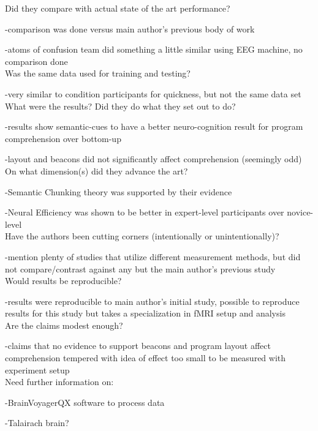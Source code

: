 \documentclass{IEEEtran}
\begin{document}
Did they compare with actual state of the art performance?

-comparison was done versus main author's previous body of work

-atoms of confusion team did something a little similar using EEG machine, no comparison done
\\

Was the same data used for training and testing?

-very similar to condition participants for quickness, but not the same data set
\\

What were the results? Did they do what they set out to do?

-results show semantic-cues to have a better neuro-cognition result for program comprehension over bottom-up 

-layout and beacons did not significantly affect comprehension (seemingly odd)
\\

On what dimension(s) did they advance the art?

-Semantic Chunking theory was supported by their evidence

-Neural Efficiency was shown to be better in expert-level participants over novice-level 
\\

Have the authors been cutting corners (intentionally or unintentionally)?

-mention plenty of studies that utilize different measurement methods, but did not compare/contrast against any but 
the main author's previous study
\\

Would results be reproducible? 

-results were reproducible to main author's initial study, possible to reproduce results for this study but takes a 
specialization in fMRI setup and analysis
\\

Are the claims modest enough?

-claims that no evidence to support beacons and program layout affect comprehension tempered with idea of effect too 
small to be measured with experiment setup
\\

Need further information on:

-BrainVoyagerQX software to process data

-Talairach brain?
\end{document}
